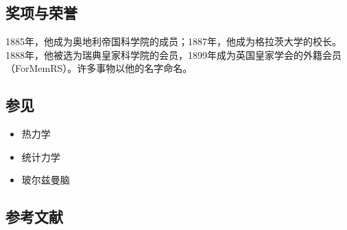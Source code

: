 \subsection{奖项与荣誉} 
1885年，他成为奥地利帝国科学院的成员；1887年，他成为格拉茨大学的校长。1888年，他被选为瑞典皇家科学院的会员，1899年成为英国皇家学会的外籍会员（ForMemRS）。许多事物以他的名字命名。
\subsection{参见}  
\begin{itemize}
\item 热力学  
\item 统计力学  
\item 玻尔兹曼脑
\end{itemize}
\subsection{参考文献}  

